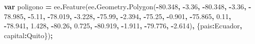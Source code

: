 \documentclass[
  12pt,
  letterpaper,
  twoside]{book}
\newenvironment{Shaded}{\begin{snugshade}}{\end{snugshade}}
\newcommand{\AttributeTok}[1]{\textcolor[rgb]{0.77,0.63,0.00}{#1}}
\newcommand{\DataTypeTok}[1]{\textcolor[rgb]{0.13,0.29,0.53}{#1}}
\newcommand{\FloatTok}[1]{\textcolor[rgb]{0.00,0.00,0.81}{#1}}
\newcommand{\FunctionTok}[1]{\textcolor[rgb]{0.00,0.00,0.00}{#1}}
\newcommand{\KeywordTok}[1]{\textcolor[rgb]{0.13,0.29,0.53}{\textbf{#1}}}
\newcommand{\NormalTok}[1]{#1}
\newcommand{\OperatorTok}[1]{\textcolor[rgb]{0.81,0.36,0.00}{\textbf{#1}}}
\newcommand{\StringTok}[1]{\textcolor[rgb]{0.31,0.60,0.02}{#1}}
\begin{document}
\begin{Shaded}
\begin{Highlighting}[]
\KeywordTok{var}\NormalTok{ poligono }\OperatorTok{=}\NormalTok{ ee}\OperatorTok{.}\FunctionTok{Feature}\NormalTok{(ee}\OperatorTok{.}\AttributeTok{Geometry}\OperatorTok{.}\FunctionTok{Polygon}\NormalTok{(}\OperatorTok{{-}}\FloatTok{80.348}\OperatorTok{,} \OperatorTok{{-}}\FloatTok{3.36}\OperatorTok{,} \OperatorTok{{-}}\FloatTok{80.348}\OperatorTok{,} \OperatorTok{{-}}\FloatTok{3.36}\OperatorTok{,}
  \OperatorTok{{-}}                             \FloatTok{78.985}\OperatorTok{,} \OperatorTok{{-}}\FloatTok{5.11}\OperatorTok{,} \OperatorTok{{-}}\FloatTok{78.019}\OperatorTok{,} \OperatorTok{{-}}\FloatTok{3.228}\OperatorTok{,}
                                \OperatorTok{{-}}\FloatTok{75.99}\OperatorTok{,} \OperatorTok{{-}}\FloatTok{2.394}\OperatorTok{,} \OperatorTok{{-}}\FloatTok{75.25}\OperatorTok{,} \OperatorTok{{-}}\FloatTok{0.901}\OperatorTok{,}
                                \OperatorTok{{-}}\FloatTok{75.865}\OperatorTok{,} \FloatTok{0.11}\OperatorTok{,} \OperatorTok{{-}}\FloatTok{78.941}\OperatorTok{,} \FloatTok{1.428}\OperatorTok{,}
                                \OperatorTok{{-}}\FloatTok{80.26}\OperatorTok{,} \FloatTok{0.725}\OperatorTok{,} \OperatorTok{{-}}\FloatTok{80.919}\OperatorTok{,} \OperatorTok{{-}}\FloatTok{1.911}\OperatorTok{,}
                                \OperatorTok{{-}}\FloatTok{79.776}\OperatorTok{,} \OperatorTok{{-}}\FloatTok{2.614}\NormalTok{)}\OperatorTok{,}
\NormalTok{\{}\DataTypeTok{pais}\OperatorTok{:}\StringTok{\textquotesingle{}Ecuador\textquotesingle{}}\OperatorTok{,} 
\DataTypeTok{capital}\OperatorTok{:}\StringTok{\textquotesingle{}Quito\textquotesingle{}}\NormalTok{\})}\OperatorTok{;}


\end{Highlighting}
\end{Shaded}
\end{document}
